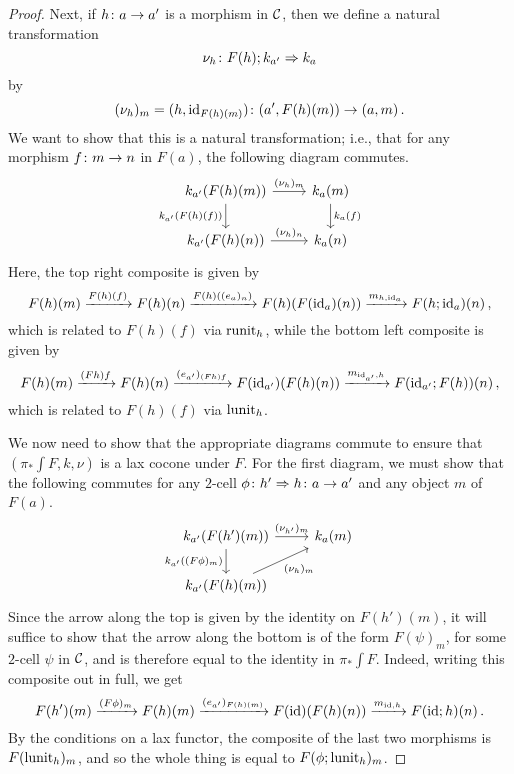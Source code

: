 \documentclass{article}
\begin{document}
\begin{proof}
  Next, if $h\colon a \to a'$ is a morphism in ${\mathcal{C}}$, then we define a natural transformation
  \[
    \nu_h \colon F(h);k_{a'} \Rightarrow k_a
    \]
  by
  \[
    (\nu_h)_m = (h, \operatorname{id}_{F(h)(m)}) \colon (a',F(h)(m)) \to (a,m)\,.
    \]
  We want to show that this is a natural transformation; i.e., that for any morphism $f \colon m \to n$ in $F(a)$, the following diagram commutes.
  \[
    \begin{tikzcd}
      k_{a'}(F(h)(m)) \arrow[r, "(\nu_h)_m"] \arrow[d, "k_{a'}(F(h)(f))"']
        & k_a(m) \arrow[d, "k_a(f)"] \\
      k_{a'}(F(h)(n)) \arrow[r, "(\nu_h)_n"]
        & k_a(n)
    \end{tikzcd}
    \]
  Here, the top right composite is given by
  \[
    F(h)(m) \xrightarrow{F(h)(f)}
    F(h)(n) \xrightarrow{F(h)((e_{a})_n)}
    F(h)(F(\operatorname{id}_a)(n)) \xrightarrow{m_{h,\operatorname{id}_a}}
    F(h;\operatorname{id}_a)(n)\,,
    \]
  which is related to $F(h)(f)$ via $\operatorname{runit}_h$, while the bottom left composite is given by
  \[
    F(h)(m) \xrightarrow{(Fh)f}
    F(h)(n) \xrightarrow{(e_{a'})_{(Fh)f}}
    F(\operatorname{id}_{a'})(F(h)(n)) \xrightarrow{m_{\operatorname{id}_{a'},h}}
    F(\operatorname{id}_{a'};F(h))(n)\,,
    \]
  which is related to $F(h)(f)$ via $\operatorname{lunit}_h$.

  We now need to show that the appropriate diagrams commute to ensure that $\left(\pi_*\int F,k,\nu\right)$ is a lax cocone under $F$.
  For the first diagram, we must show that the following commutes for any $2$-cell $\phi\colon h' \Rightarrow h\colon a \to a'$ and any object $m$ of $F(a)$.
  \[
    \begin{tikzcd}
      k_{a'}(F(h')(m)) \arrow[r, "(\nu_{h'})_m"] \arrow[d, "k_{a'}((F\phi)_m)"']
        & k_a(m) \\
      k_{a'}(F(h)(m)) \arrow[ur, "(\nu_h)_m"']
        &
    \end{tikzcd}
    \]
  Since the arrow along the top is given by the identity on $F(h')(m)$, it will suffice to show that the arrow along the bottom is of the form $F(\psi)_m$, for some $2$-cell $\psi$ in ${\mathcal{C}}$, and is therefore equal to the identity in $\pi_*\int F$.
  Indeed, writing this composite out in full, we get
  \[
    F(h')(m) \xrightarrow{(F\phi)_m}
    F(h)(m) \xrightarrow{(e_{a'})_{F(h)(m)}}
    F(\operatorname{id})(F(h)(n)) \xrightarrow{m_{\operatorname{id},h}}
    F(\operatorname{id};h)(n)\,.
    \]
  By the conditions on a lax functor, the composite of the last two morphisms is $F(\operatorname{lunit}_h)_m$, and so the whole thing is equal to $F(\phi;\operatorname{lunit}_h)_m$.


\end{proof}
\end{document}
